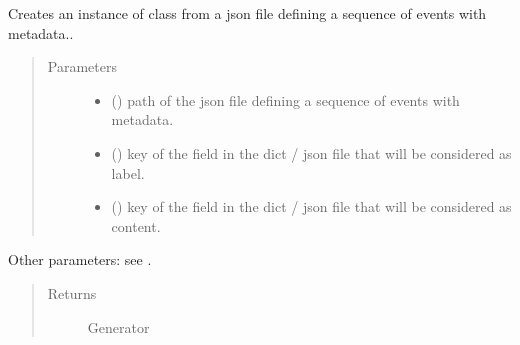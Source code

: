 \documentclass[letterpaper,10pt,english]{sphinxmanual}
\begin{document}
\begin{fulllineitems}
\label{\detokenize{index:GeneratorBuilder.new_generator_from_json_file}}
Creates an instance of class {\hyperref[\detokenize{index:Generator.Generator}]{}} from a json file defining a sequence of events with metadata..
\begin{quote}\begin{description}
\item[{Parameters}] \leavevmode\begin{itemize}
\item {} 
 () \textendash{} path of the json file defining a sequence of events with metadata.

\item {} 
 () \textendash{} key of the field in the dict / json file that will be considered as label.

\item {} 
 () \textendash{} key of the field in the dict / json file that will be considered as content.

\end{itemize}

\end{description}\end{quote}

Other parameters: see {\hyperref[\detokenize{index:Generator.Generator}]{}}.
\begin{quote}\begin{description}
\item[{Returns}] \leavevmode
Generator


\end{description}
\end{quote}
\end{fulllineitems}
\end{document}
